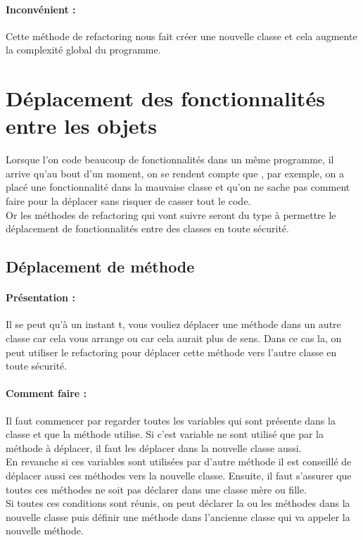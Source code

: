 \documentclass[a4paper,twoside,12pt,openright]{report}
\begin{document}
\paragraph{Inconvénient :}
Cette méthode de refactoring nous fait créer une nouvelle classe et cela augmente la complexité global du programme.

\newpage

\section{Déplacement des fonctionnalités entre les objets}
Lorsque l'on code beaucoup de fonctionnalités dans un même programme, il arrive qu'au bout d'un moment, on se rendent compte que , par exemple, on a placé une fonctionnalité dans la mauvaise classe et qu'on ne sache pas comment faire pour la déplacer sans risquer de casser tout le code.\\
Or les méthodes de refactoring qui vont suivre seront du type à permettre le déplacement de fonctionnalités entre des classes en toute sécurité.


\subsection{Déplacement de méthode}
\paragraph{Présentation :}
Il se peut qu'à un instant t, vous vouliez déplacer une méthode dans un autre classe car cela vous arrange ou car cela aurait plus de sens. Dans ce cas la, on peut utiliser le refactoring pour déplacer cette méthode vers l'autre classe en toute sécurité.

\paragraph{Comment faire :}
Il faut commencer par regarder toutes les variables qui sont présente dans la classe et que la méthode utilise. Si c'est variable ne sont utilisé que par la méthode à déplacer, il faut les déplacer dans la nouvelle classe aussi.\\
En revanche si ces variables sont utilisées par d'autre méthode il est conseillé de déplacer aussi ces méthodes vers la nouvelle classe.
Ensuite, il faut s'assurer que toutes ces méthodes ne soit pas déclarer dans une classe mère ou fille.\\
Si toutes ces conditions sont réunis, on peut déclarer la ou les méthodes dans la nouvelle classe puis définir une méthode dans l'ancienne classe qui va appeler la nouvelle méthode.
\end{document}
